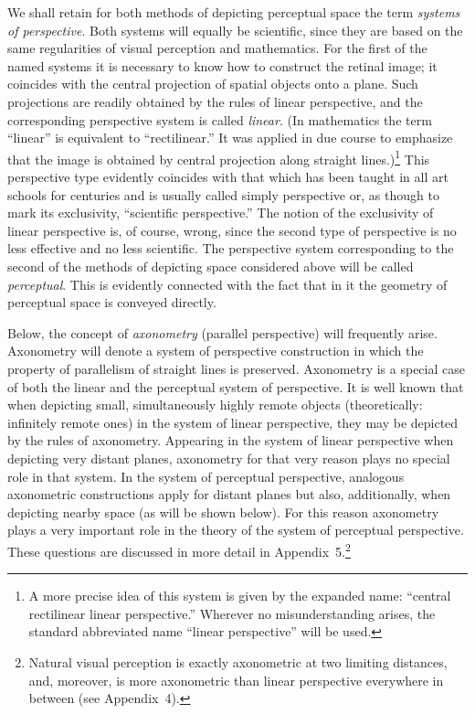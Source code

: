 We shall retain for both methods of depicting perceptual space the term \emph{systems
of perspective}.  Both systems will equally be scientific, since they are based on the
same regularities of visual perception and mathematics.  For the first of the named
systems it is necessary to know how to construct the retinal image; it coincides with
the central projection of spatial objects onto a plane.  Such projections are readily
obtained by the rules of linear perspective, and the corresponding perspective system
is called \emph{linear}.  (In mathematics the term ``linear'' is equivalent to
``rectilinear.'' It was applied in due course to emphasize that the image is obtained by
central projection along straight lines.)\footnote{%
  A more precise idea of this system is given by the expanded name: ``central
  rectilinear linear perspective.'' Wherever no misunderstanding arises, the standard
  abbreviated name ``linear perspective'' will be used.}
  This perspective type evidently coincides with that which has been taught in all art
schools for centuries and is usually called simply perspective or, as though to mark
its exclusivity, ``scientific perspective.''  The notion of the exclusivity of linear
perspective is, of course, wrong, since the second type of perspective is no less
effective and no less scientific.  The perspective system corresponding to the second
of the methods of depicting space considered above will be called \emph{perceptual}.
This is evidently connected with the fact that in it the geometry of perceptual space is
conveyed directly.

Below, the concept of \emph{axonometry} (parallel perspective) will frequently arise.
Axonometry will denote a system of perspective construction in which the property of
parallelism of straight lines is preserved.  Axonometry is a special case of both the
linear and the perceptual system of perspective.  It is well known that when depicting
small, simultaneously highly remote objects (theoretically: infinitely remote ones) in
the system of linear perspective, they may be depicted by the rules of axonometry.
Appearing in the system of linear perspective when depicting very distant planes,
axonometry for that very reason plays no special role in that system.  In the system of
perceptual perspective, analogous axonometric constructions apply for distant planes but
also, additionally, when depicting nearby space (as will be shown below).  For this
reason axonometry plays a very important role in the theory of the system of perceptual
perspective.  These questions are discussed in more detail in Appendix~5.\footnote{%
  Natural visual perception is exactly axonometric at two limiting distances, and,
  moreover, is more axonometric than linear perspective everywhere in between (see
  Appendix~4).}

